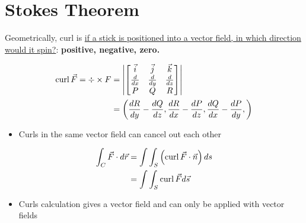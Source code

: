 \section{Stokes Theorem}

  Geometrically, curl is \ul{if a stick is positioned into a vector field,
  in which direction would it spin?}: \textbf{positive, negative, zero.}

  \begin{align}
    \operatorname{curl} \vec{F} = \div \times F &=
    \left|
      \begin{bmatrix}
        \vec{i} & \vec{j} & \vec{k} \\
        \frac{d}{dx} & \frac{d}{dy} & \frac{d}{dz} \\
        P & Q & R
      \end{bmatrix}
    \right| \\
    &=
    \left(
      \frac{dR}{dy} - \frac{dQ}{dz},
      \frac{dR}{dx} - \frac{dP}{dz},
      \frac{dQ}{dx} - \frac{dP}{dy},
    \right)
  \end{align}

  \begin{itemize}
    \item Curls in the same vector field can cancel out each other
  \end{itemize}

  \begin{align}
    \int_{C} \vec{F} \cdot d \vec{r}
    &= \int \int_{S} \left( \operatorname{curl} \vec{F} \cdot \vec{n} \right) ds \\
    &= \int \int_{S} \operatorname{curl}\vec{F} d\vec{s}
  \end{align}

  \begin{itemize}
    \item Curls calculation gives a vector field and can only be applied
    with vector fields
  \end{itemize}